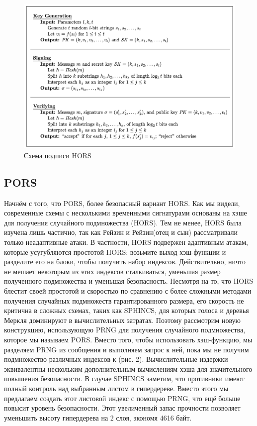 \documentclass[a4paper, 14pt]{extarticle}
\begin{document}
\begin{figure}[h]
    \centering
    \includegraphics[scale=0.66]{HORS.png}
    \caption{Схема подписи HORS}
\end{figure}
\subsection{PORS}
Начнём с того, что PORS, более безопасный вариант HORS. Как мы видели, современные схемы с несколькими временными сигнатурами основаны на хэше для получения случайного подмножества (HORS). Тем не менее, HORS была изучена лишь частично, так как Рейзин и Рейзин(отец и сын) рассматривали только неадаптивные атаки. В частности, HORS подвержен адаптивным атакам, которые усугубляются простотой HORS: возьмите выход хэш-функции и разделите его на блоки, чтобы получить набор индексов. Действительно, ничто не мешает некоторым из этих индексов сталкиваться, уменьшая размер полученного подмножества и уменьшая безопасность. Несмотря на то, что HORS блестит своей простотой и скоростью по сравнению с более сложными методами получения случайных подмножеств гарантированного размера, его скорость не критична в сложных схемах, таких как SPHINCS, для которых голоса и деревья Меркля доминируют в вычислительных затратах. Поэтому рассмотрим новую конструкцию, использующую PRNG для получения случайного подмножества, которое мы называем PORS. Вместо того, чтобы использовать хэш-функцию, мы разделяем PRNG из сообщения и выполняем запрос к ней, пока мы не получим подмножество различных индексов к (рис. 2). Вычислительные издержки эквивалентны нескольким дополнительным вычислениям хэша для значительного повышения безопасности. В случае SPHINCS заметим, что противники имеют полный контроль над выбранным листом в гипердереве. Вместо этого мы предлагаем создать этот листовой индекс с помощью PRNG, что ещё больше повысит уровень безопасности. Этот увеличенный запас прочности позволяет уменьшить высоту гипердерева на 2 слоя, экономя 4616 байт.
\end{document}
